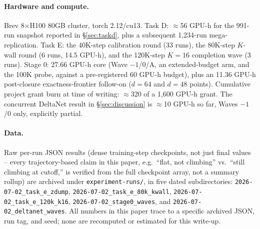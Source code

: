 \paragraph{Hardware and compute.} Brev 8$\times$H100 80GB cluster, torch
2.12/cu13. Task D: $\approx$56 GPU-h for the 991-run snapshot reported in
\S\ref{sec:taskd}, plus a subsequent 1{,}234-run mega-replication. Task E:
the 40K-step calibration round (33 runs), the 80K-step $K$-wall round (6
runs, 14.5 GPU-h), and the 120K-step $K{=}16$ completion wave (3 runs).
Stage 0: 27.66 GPU-h core (Wave $-1$/0/A, an extended-budget arm, and the
100K probe, against a pre-registered 60 GPU-h budget), plus an 11.36 GPU-h
post-closure exactness-frontier follow-on ($d{=}64$ and $d{=}48$ points).
Cumulative project grant burn at time of writing: $\approx$320 of a 1{,}600
GPU-h grant. The concurrent DeltaNet result in \S\ref{sec:discussion} is
$\approx$10 GPU-h so far, Waves $-1$/0 only, explicitly partial.

\paragraph{Data.} Raw per-run JSON results (dense training-step
checkpoints, not just final values -- every trajectory-based claim in this
paper, e.g.\ ``flat, not climbing'' vs.\ ``still climbing at cutoff,'' is
verified from the full checkpoint array, not a summary rollup) are archived
under \texttt{experiment-runs/}, in five dated subdirectories: \texttt{2026-07-02\_task\_e\_zdump},
\texttt{2026-07-02\_task\_e\_80k\_kwall}, \texttt{2026-07-02\_task\_e\_120k\_k16},
\texttt{2026-07-02\_stage0\_waves}, and \texttt{2026-07-02\_deltanet\_waves}.
All numbers in
this paper trace to a specific archived JSON, run tag, and seed; none are
recomputed or estimated for this write-up.
